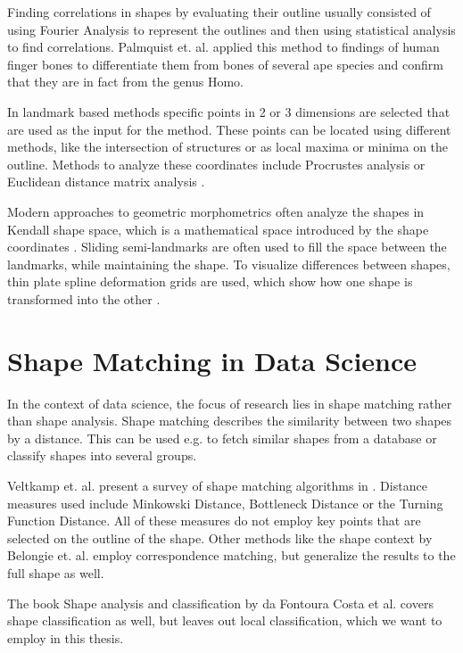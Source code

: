 \documentclass[pdftex,12pt,a4paper]{report}
\begin{document}
Finding correlations in shapes by evaluating their outline usually consisted of using Fourier Analysis to represent the outlines and then using statistical analysis to find correlations. Palmquist et. al. \cite{palmqvist1996comparative} applied this method to findings of human finger bones to differentiate them from bones of several ape species and confirm that they are in fact from the genus Homo. 

In landmark based methods specific points in 2 or 3 dimensions are selected that are used as the input for the method. These points can be located using different methods, like the intersection of structures or as local maxima or minima on the outline. Methods to analyze these coordinates include Procrustes analysis \cite{small1996statistical} or Euclidean distance matrix analysis \cite{lele1991euclidean}.

Modern approaches to geometric morphometrics often analyze the shapes in Kendall shape space, which is a mathematical space introduced by the shape coordinates \cite{mitteroecker2009advances}. Sliding semi-landmarks are often used to fill the space between the landmarks, while maintaining the shape. To visualize differences between shapes, thin plate spline deformation grids are used, which show how one shape is transformed into the other \cite{adams2004geometric}.

\section{Shape Matching in Data Science}

In the context of data science, the focus of research lies in shape matching rather than shape analysis. Shape matching describes the similarity between two shapes by a distance. This can be used e.g. to fetch similar shapes from a database or classify shapes into several groups.

Veltkamp et. al. present a survey of shape matching algorithms in \cite{veltkamp2001shape}. Distance measures used include Minkowski Distance, Bottleneck Distance or the Turning Function Distance. All of these measures do not employ key points that are selected on the outline of the shape. Other methods like the shape context by Belongie et. al. \cite{belongie2002shape} employ correspondence matching, but generalize the results to the full shape as well.

The book \grqq Shape analysis and classification \grqq by da Fontoura Costa et al. \cite{da2010shape} covers shape classification as well, but leaves out local classification, which we want to employ in this thesis.
\end{document}
